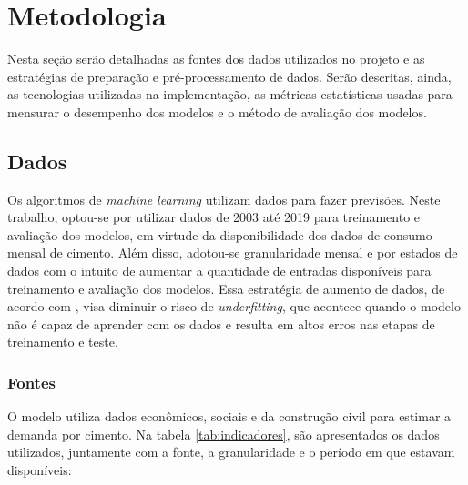 
\chapter{Metodologia}



Nesta seção serão detalhadas as fontes dos dados utilizados no 
projeto e as estratégias de preparação e pré-processamento de 
dados. Serão descritas, ainda, as 
tecnologias utilizadas na implementação, as métricas estatísticas 
usadas para mensurar o desempenho dos modelos e o método de
 avaliação dos modelos.

\section{Dados}
\label{sec:dados}

Os algoritmos de \textit{machine learning} utilizam dados para fazer 
previsões. 
Neste trabalho, optou-se por utilizar dados de 2003 até 2019 para treinamento e 
avaliação dos modelos, em virtude da disponibilidade dos dados de consumo mensal 
de cimento. Além disso,
adotou-se granularidade
mensal e por estados de dados com o intuito de aumentar a quantidade de entradas disponíveis 
para treinamento e avaliação dos modelos.
Essa estratégia de aumento de dados, de acordo com \citet{Goodfellow-et-al-2016}, visa diminuir o risco de  
\textit{underfitting}, que acontece quando o 
modelo não é capaz de aprender com os dados e resulta em altos erros nas etapas de
treinamento e teste.


\subsection{Fontes}

O modelo utiliza dados econômicos, sociais e da construção
civil para estimar a demanda por cimento. Na tabela
\ref{tab:indicadores}, são
apresentados os dados utilizados, juntamente com a fonte, a granularidade 
e o período em que estavam disponíveis:


